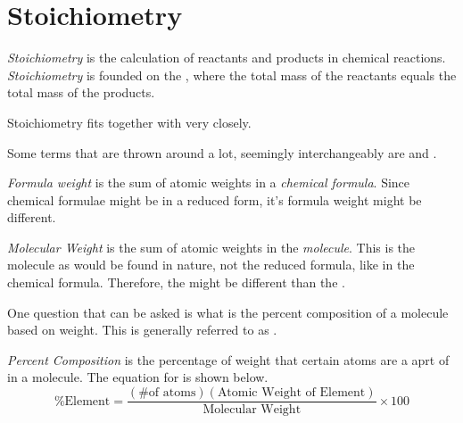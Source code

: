 \section{Stoichiometry} \label{sec:Stoichiometry}
\begin{definition}[Stoichiometry] \label{def:Stoichiometry}
  \emph{Stoichiometry} is the calculation of reactants and products in chemical reactions.
  \emph{Stoichiometry} is founded on the , where the total mass of the reactants equals the total mass of the products.
\end{definition}

Stoichiometry fits together with  very closely.

Some terms that are thrown around a lot, seemingly interchangeably are  and .

\begin{definition} \label{def:Formula Weight}
  \emph{Formula weight} is the sum of atomic weights in a \emph{chemical formula}.
  Since chemical formulae might be in a reduced form, it's formula weight might be different.
\end{definition}

\begin{definition} \label{def:Molecular Weight}
  \emph{Molecular Weight} is the sum of atomic weights in the \emph{molecule}.
  This is the molecule as would be found in nature, not the reduced formula, like in the chemical formula.
  Therefore, the  might be different than the .
\end{definition}

One question that can be asked is what is the percent composition of a molecule based on weight.
This is generally referred to as .
\begin{definition} \label{def:Percent Composition}
  \emph{Percent Composition} is the percentage of weight that certain atoms are a aprt of in a molecule.
  The equation for  is shown below.
  \begin{equation} \label{eq:Percent Composition}
    \text{\% Element} = \frac{\left( \text{\# of atoms} \right) \left( \text{Atomic Weight of Element} \right)}{\text{Molecular Weight}} \times 100
  \end{equation}
\end{definition}

